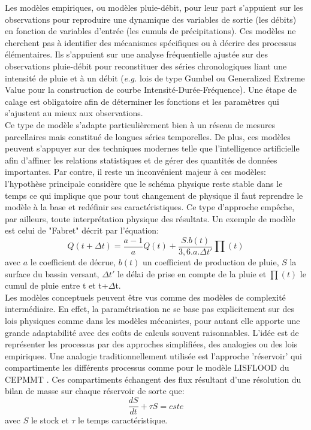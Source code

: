 Les modèles empiriques, ou modèles pluie-débit, pour leur part s'appuient sur les observations pour reproduire une dynamique des variables de sortie (les débits) en fonction de variables d'entrée (les cumuls de précipitations). Ces modèles ne cherchent pas à identifier des mécanismes spécifiques ou à décrire des processus élémentaires. Ils s'appuient sur une analyse fréquentielle ajustée sur des observations pluie-débit pour reconstituer des séries chronologiques liant une intensité de pluie et à un débit (\textit{e.g.} lois de type Gumbel ou Generalized Extreme Value pour la construction de courbe Intensité-Durée-Fréquence). Une étape de calage est obligatoire afin de déterminer les fonctions et les paramètres qui s'ajustent au mieux aux observations. \\
Ce type de modèle s'adapte particulièrement bien à un réseau de mesures parcellaires mais constitué de longues séries temporelles. De plus, ces modèles peuvent s'appuyer sur des techniques modernes telle que l'intelligence artificielle afin d'affiner les relations statistiques et de gérer des quantités de données importantes. Par contre, il reste un inconvénient majeur à ces modèles: l'hypothèse principale considère que le schéma physique reste stable dans le temps ce qui implique que pour tout changement de physique il faut reprendre le modèle à la base et redéfinir ses caractéristiques. Ce type d'approche empêche, par ailleurs, toute interprétation physique des résultats. Un exemple de modèle est celui de "Fabret" décrit par l'équation:
\begin{equation}
Q(t + \Delta t) = \frac{a-1}{a}Q(t) + \frac{S.b(t)}{3,6 .a.\Delta t'}\prod(t)
\end{equation}
avec $a$ le coefficient de décrue, $b(t)$ un coefficient de production de pluie, $S$ la surface du bassin versant, $\Delta t'$ le délai de prise en compte de la pluie et $\prod(t)$ le cumul de pluie entre t et t+$\Delta$t. \\

Les modèles conceptuels peuvent être vus comme des modèles de complexité intermédiaire. En effet, la paramétrisation ne se base pas explicitement sur des lois physiques comme dans les modèles mécanistes, pour autant elle apporte une grande adaptabilité avec des coûts de calculs souvent raisonnables. L'idée est de représenter les processus par des approches simplifiées, des analogies ou des lois empiriques. Une analogie traditionnellement utilisée est l'approche 'réservoir' qui compartimente les différents processus comme pour le modèle LISFLOOD du CEPMMT \citep[Centre Européen pour les Prévisions Météorologiques à Moyen Terme,][]{burek2013}. Ces compartiments échangent des flux résultant d'une résolution du bilan de masse sur chaque réservoir de sorte que: 
\begin{equation}
\frac{dS}{dt} + \tau S = cste
\end{equation}
avec $S$ le stock et $\tau$ le temps caractéristique. \\

